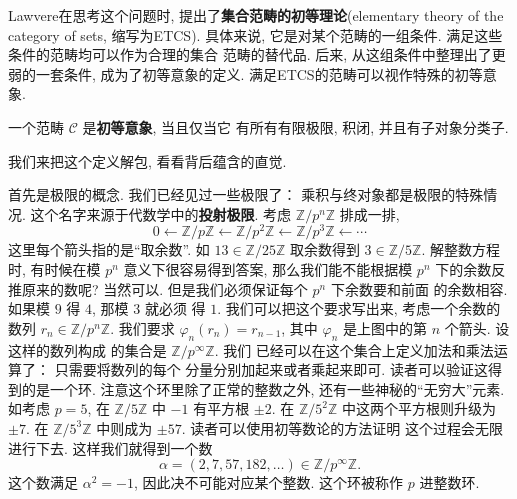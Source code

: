 Lawvere在思考这个问题时, 提出了\textbf{集合范畴的初等理论}(elementary
theory of the category of sets, 缩写为ETCS). 具体来说,
它是对某个范畴的一组条件. 满足这些条件的范畴均可以作为合理的集合
范畴的替代品. 后来, 从这组条件中整理出了更弱的一套条件,
成为了初等意象的定义. 满足ETCS的范畴可以视作特殊的初等意象.
\begin{definition}
一个范畴 \(\mathcal C\) 是\textbf{初等意象}, 当且仅当它
有所有有限极限, 积闭, 并且有子对象分类子.
\end{definition}
我们来把这个定义解包, 看看背后蕴含的直觉.

首先是极限的概念.
我们已经见过一些极限了： 乘积与终对象都是极限的特殊情况.
这个名字来源于代数学中的\textbf{投射极限}. 考虑
\(\mathbb Z/p^n\mathbb Z\) 排成一排,
\[0 \longleftarrow \mathbb Z/p\mathbb Z
\longleftarrow \mathbb Z/p^2\mathbb Z
\longleftarrow \mathbb Z/p^3\mathbb Z
\longleftarrow \cdots\]
这里每个箭头指的是“取余数”. 如
\(13 \in \mathbb Z/25\mathbb Z\)
取余数得到 \(3 \in \mathbb Z/5 \mathbb Z\).
解整数方程时, 有时候在模 \(p^n\) 意义下很容易得到答案,
那么我们能不能根据模 \(p^n\) 下的余数反推原来的数呢?
当然可以. 但是我们必须保证每个 \(p^n\) 下余数要和前面
的余数相容. 如果模 \(9\) 得 \(4\), 那模 \(3\) 就必须
得 \(1\). 我们可以把这个要求写出来, 考虑一个余数的数列
\(r_n \in \mathbb Z/p^n\mathbb Z\).
我们要求 \(\varphi_n(r_n) = r_{n-1}\), 其中
\(\varphi_n\) 是上图中的第 \(n\) 个箭头. 设这样的数列构成
的集合是 \(\mathbb Z/p^{\infty}\mathbb Z\). 我们
已经可以在这个集合上定义加法和乘法运算了： 只需要将数列的每个
分量分别加起来或者乘起来即可. 读者可以验证这得到的是一个环.
注意这个环里除了正常的整数之外, 还有一些神秘的“无穷大”元素.
如考虑 \(p = 5\), 在 \(\mathbb Z/5\mathbb Z\) 中
\(-1\) 有平方根 \(\pm2\). 在 \(\mathbb Z/5^2\mathbb Z\)
中这两个平方根则升级为 \(\pm7\). 在 \(\mathbb Z/5^3\mathbb Z\)
中则成为 \(\pm57\). 读者可以使用初等数论的方法证明
这个过程会无限进行下去. 这样我们就得到一个数
\[\alpha = (2,7,57,182,\dots) \in \mathbb Z/p^{\infty}\mathbb Z.\]
这个数满足 \(\alpha^2 = -1\), 因此决不可能对应某个整数.
这个环被称作 \(p\) 进整数环.


